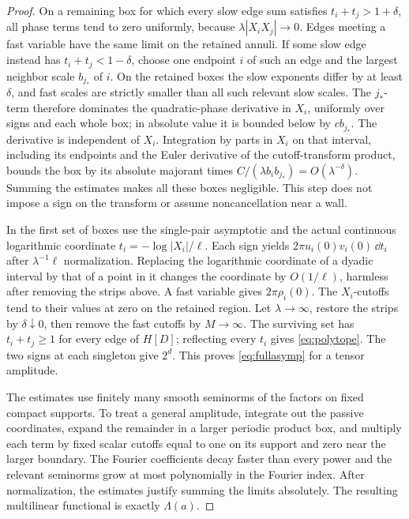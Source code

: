 \begin{proof}
On a remaining box for which every slow edge sum satisfies \(t_i+t_j>1+\delta\), all phase terms tend to zero uniformly, because \(\lambda |X_iX_j|\to0\). Edges meeting a fast variable have the same limit on the retained annuli. If some slow edge instead has \(t_i+t_j<1-\delta\), choose one endpoint \(i\) of such an edge and the largest neighbor scale \(b_{j_*}\) of \(i\). On the retained boxes the slow exponents differ by at least \(\delta\), and fast scales are strictly smaller than all such relevant slow scales. The \(j_*\)-term therefore dominates the quadratic-phase derivative in \(X_i\), uniformly over signs and each whole box; in absolute value it is bounded below by \(c b_{j_*}\). The derivative is independent of \(X_i\). Integration by parts in \(X_i\) on that interval, including its endpoints and the Euler derivative of the cutoff-transform product, bounds the box by its absolute majorant times \(C/(\lambda b_i b_{j_*})=O(\lambda^{-\delta})\). Summing the estimates makes all these boxes negligible. This step does not impose a sign on the transform or assume noncancellation near a wall.

In the first set of boxes use the single-pair asymptotic and the actual continuous logarithmic coordinate \(t_i=-\log|X_i|/\ell\). Each sign yields \(2\pi u_i(0)v_i(0)\,\dd t_i\) after \(\lambda^{-1}\ell\) normalization. Replacing the logarithmic coordinate of a dyadic interval by that of a point in it changes the coordinate by \(O(1/\ell)\), harmless after removing the strips above. A fast variable gives \(2\pi\rho_i(0)\). The \(X_i\)-cutoffs tend to their values at zero on the retained region. Let \(\lambda\to\infty\), restore the strips by \(\delta\downarrow0\), then remove the fast cutoffs by \(M\to\infty\). The surviving set has \(t_i+t_j\ge1\) for every edge of \(H[D]\); reflecting every \(t_i\) gives \eqref{eq:polytope}. The two signs at each singleton give \(2^d\). This proves \eqref{eq:fullasymp} for a tensor amplitude.

The estimates use finitely many smooth seminorms of the factors on fixed compact supports. To treat a general amplitude, integrate out the passive coordinates, expand the remainder in a larger periodic product box, and multiply each term by fixed scalar cutoffs equal to one on its support and zero near the larger boundary. The Fourier coefficients decay faster than every power and the relevant seminorms grow at most polynomially in the Fourier index. After normalization, the estimates justify summing the limits absolutely. The resulting multilinear functional is exactly \(\Lambda(a)\).


\end{proof}
